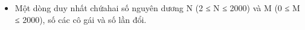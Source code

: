 \begin{itemize}
	\item Một dòng duy nhất chứahai số nguyên dương N (2 ≤ N ≤ 2000) và M (0 ≤ M ≤ 2000), số các cô gái và số lần đổi.
\end{itemize}